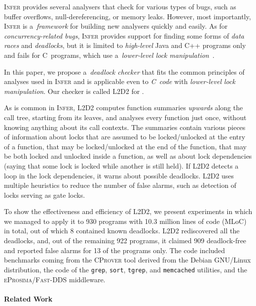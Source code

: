 \documentclass[runningheads]{llncs}
\newcommand{\LLDD}{\textsc{L2D2}\xspace} %
\newcommand{\Infer}{\textsc{Infer}\xspace}
\newcommand{\CProver}{\textsc{CProver}\xspace}
\newcommand{\grep}{\texttt{grep}\xspace}
\newcommand{\sort}{\texttt{sort}\xspace}
\newcommand{\tgrep}{\texttt{tgrep}\xspace}
\newcommand{\memcached}{\texttt{memcached}\xspace}
\newcommand{\DDS}{\textsc{Fast-DDS}\xspace}
\newcommand{\eprosimaDDS}{\textsc{eProsima/\DDS}\xspace}
\begin{document}
\Infer provides several analysers that check for various types of bugs, such as
buffer overflows, null-dereferencing, or memory leaks.  However, most
importantly, \Infer is a~\emph{framework} for building new analysers quickly and
easily. As for \emph{concurrency-related bugs}, \Infer provides support for
finding some forms of \emph{data races} and \emph{deadlocks}, but it is limited
to \emph{high-level} Java and C++ programs only and fails for C~programs, which
use a~\emph{lower-level lock manipulation}~\cite{racerD18,inferCACM19}.

In this paper, we propose a~\emph{deadlock checker} that fits the common
principles of analyses used in \Infer and is applicable even to \emph{C~code}
with \emph{lower-level lock manipulation}. Our checker is called \LLDD for
.

As is common in \Infer, \LLDD computes function summaries \emph{upwards} along
the call tree, starting from its leaves, and analyses every function just once,
without knowing anything about its call contexts.
%
The summaries contain various pieces of information about locks that are assumed
to be locked/unlocked at the entry of a function, that may be locked/unlocked at
the end of the function, that may be both locked and unlocked inside a function,
as well as about lock dependencies (saying that some lock is locked while
another is still held).
%
If \LLDD detects a loop in the lock dependencies, it warns about possible
deadlocks.
%
\LLDD uses multiple heuristics to reduce the number of false alarms, such as
detection of locks serving as gate locks.

To show the effectiveness and efficiency of \LLDD, we present experiments in
which we managed to apply it to 930 programs with 10.3 million lines of code
(MLoC) in total, out of which 8 contained known deadlocks.
%
\LLDD rediscovered all the deadlocks, and, out of the remaining 922 programs, it
claimed 909 deadlock-free and reported false alarms for 13 of the programs only.
%
The code included benchmarks coming from the \CProver tool derived from the
Debian GNU/Linux distribution, the code of the \grep, \sort, \tgrep, and
\memcached utilities, and the \eprosimaDDS middleware.

\enlargethispage{4mm}

\vspace*{-3mm}\paragraph{Related Work} %
\end{document}
